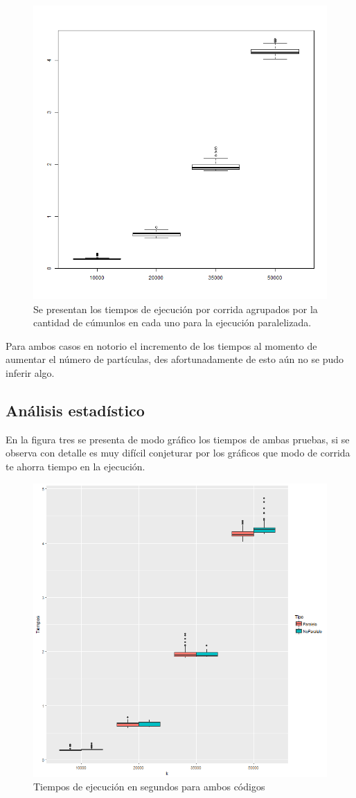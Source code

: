 \documentclass[a4paper]{article}
\begin{document}
\begin{figure}[h]
\centering
\includegraphics[width=0.7\linewidth]{Vparalelo}
\caption{Se presentan los tiempos de ejecución por corrida agrupados por la cantidad de cúmunlos en cada uno para la ejecución paralelizada.}
\label{fig:Vparalelo}
\end{figure}

Para ambos casos en notorio el incremento de los tiempos al momento de aumentar el número de partículas, des afortunadamente de esto aún no se pudo inferir algo.

\subsection{Análisis estadístico}
En la figura tres se presenta de modo gráfico los tiempos de ambas pruebas, si se observa con detalle es muy difícil conjeturar por los gráficos que modo de corrida te ahorra tiempo en la ejecución.

\begin{figure}[h]
	\centering
	\includegraphics[width=0.7\linewidth]{ambos}
	\caption{Tiempos de ejecución en segundos para ambos códigos}
	\label{fig:ambos}
\end{figure}
\end{document}
